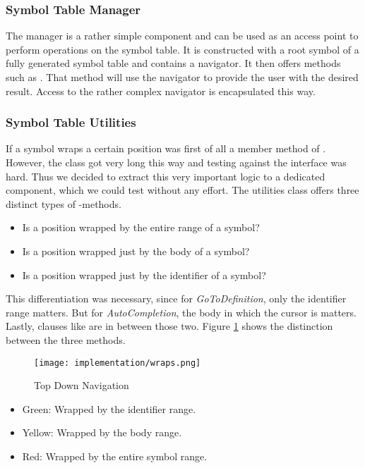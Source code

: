 \subsubsection{Symbol Table Manager}
The manager is a rather simple component and can be used as an access point to perform operations on the symbol table.
It is constructed with a root symbol of a fully generated symbol table and contains a navigator.
It then offers methods such as .
That method will use the navigator to provide the user with the desired result.
Access to the rather complex navigator is encapsulated this way.

\subsubsection{Symbol Table Utilities}
If a symbol wraps a certain position was first of all a member method of .
However, the class  got very long this way and testing against the interface was hard.
Thus we decided to extract this very important logic to a dedicated component, which we could test without any effort.
The utilities class offers three distinct types of -methods.
\begin{itemize}
    \item Is a position wrapped by the entire range of a symbol?
    \item Is a position wrapped just by the body of a symbol?
    \item Is a position wrapped just by the identifier of a symbol?
\end{itemize}
This differentiation was necessary, since for \textit{GoToDefinition}, only the identifier range matters.
But for \textit{AutoCompletion}, the body in which the cursor is matters.
Lastly, clauses like  are in between those two.
Figure \ref{fig:topDownWraps} shows the distinction between the three methods.

\begin{figure}[H]
    \centering
    \texttt{[image: implementation/wraps.png]}
    \caption{Top Down Navigation}
    \label{fig:topDownWraps}
\end{figure}

\begin{itemize}
    \item Green: Wrapped by the identifier range.
    \item Yellow: Wrapped by the body range.
    \item Red: Wrapped by the entire symbol range.
\end{itemize}


